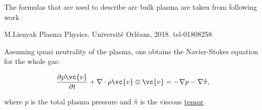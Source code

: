 The formulas that are used to describe arc bulk plasma are taken from following work
{\footnotesize
\begin{thebibliography}{99}
      M.Lisnyak Plasma Physics. Université Orléans, 2018. tel-01808258
\end{thebibliography}}

\phantom{239}

Assuming quasi neutrality of the plasma, one obtains the Navier-Stokes equation for the whole gas:

\begin{equation}
\frac{\partial \rho \vc{v}}{\partial t} + \nabla \cdot \rho \vc{v} \otimes \vc{v} = - \nabla p - \nabla \hat{\pi},
\label{ppi}
\end{equation}

where $p$ is the total plasma pressure and $\hat{\pi}$ is the viscous \hyperlink{navier}{tensor}.

